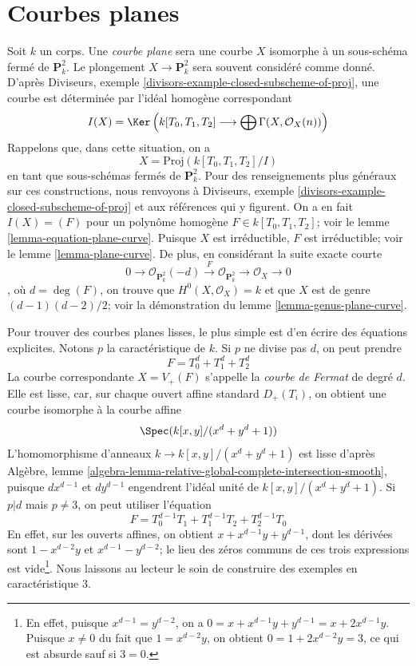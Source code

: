 \section{Courbes planes}
\label{section-plane-curves}

\noindent
Soit $k$ un corps. Une {\it courbe plane} sera une courbe $X$ isomorphe à un sous-schéma fermé de $\mathbf{P}^2_k$. Le plongement $X \to \mathbf{P}^2_k$ sera souvent considéré comme donné. D'après Diviseurs, exemple \ref{divisors-example-closed-subscheme-of-proj}, une courbe est déterminée par l'idéal homogène correspondant $$
I(X) =
\Ker\left(
k[T_0, T_1, T_2] \longrightarrow \bigoplus \Gamma(X, \mathcal{O}_X(n))
\right)
$$ Rappelons que, dans cette situation, on a $$
X = \text{Proj}(k[T_0, T_1, T_2]/I)
$$ en tant que sous-schémas fermés de $\mathbf{P}^2_k$. Pour des renseignements plus généraux sur ces constructions, nous renvoyons à Diviseurs, exemple \ref{divisors-example-closed-subscheme-of-proj} et aux références qui y figurent. On a en fait $I(X) = (F)$ pour un polynôme homogène $F \in k[T_0, T_1, T_2]$; voir le lemme \ref{lemma-equation-plane-curve}. Puisque $X$ est irréductible, $F$ est irréductible; voir le lemme \ref{lemma-plane-curve}. De plus, en considérant la suite exacte courte $$
0 \to \mathcal{O}_{\mathbf{P}^2_k}(-d) \xrightarrow{F}
\mathcal{O}_{\mathbf{P}^2_k} \to \mathcal{O}_X \to 0
$$, où $d = \deg(F)$, on trouve que $H^0(X, \mathcal{O}_X) = k$ et que $X$ est de genre $(d - 1)(d - 2)/2$; voir la démonstration du lemme \ref{lemma-genus-plane-curve}.

\medskip\noindent
Pour trouver des courbes planes lisses, le plus simple est d'en écrire des équations explicites. Notons $p$ la caractéristique de $k$. Si $p$ ne divise pas $d$, on peut prendre $$
F = T_0^d + T_1^d + T_2^d
$$ La courbe correspondante $X = V_+(F)$ s'appelle la {\it courbe de Fermat} de degré $d$. Elle est lisse, car, sur chaque ouvert affine standard $D_+(T_i)$, on obtient une courbe isomorphe à la courbe affine $$
\Spec(k[x, y]/(x^d + y^d + 1))
$$ L'homomorphisme d'anneaux $k \to k[x, y]/(x^d + y^d + 1)$ est lisse d'après Algèbre, lemme \ref{algebra-lemma-relative-global-complete-intersection-smooth}, puisque $d x^{d - 1}$ et $d y^{d - 1}$ engendrent l'idéal unité de $k[x, y]/(x^d + y^d + 1)$. Si $p | d$ mais $p \not = 3$, on peut utiliser l'équation $$
F = T_0^{d - 1}T_1 + T_1^{d - 1}T_2 + T_2^{d - 1}T_0
$$ En effet, sur les ouverts affines, on obtient $x + x^{d - 1}y + y^{d - 1}$, dont les dérivées sont $1 - x^{d - 2}y$ et $x^{d - 1} - y^{d - 2}$; le lieu des zéros communs de ces trois expressions est vide\footnote{En effet, puisque $x^{d - 1} = y^{d - 2}$, on a $0 = x + x^{d - 1}y + y^{d - 1} =
x + 2 x^{d - 1} y$. Puisque $x \not = 0$ du fait que $1 = x^{d - 2}y$, on obtient $0 = 1 + 2x^{d - 2}y = 3$, ce qui est absurde sauf si $3 = 0$.}. Nous laissons au lecteur le soin de construire des exemples en caractéristique $3$.

